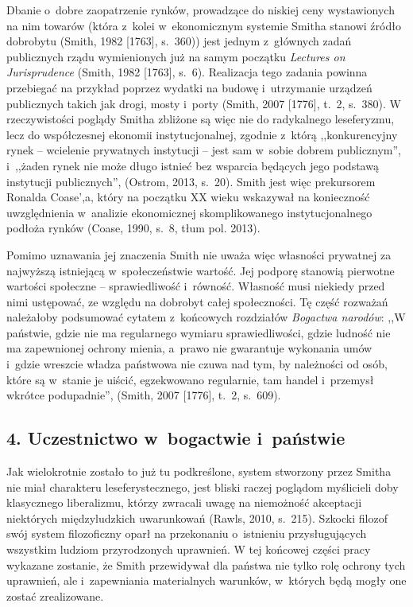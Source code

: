 Dbanie o~dobre zaopatrzenie rynków, prowadzące do niskiej ceny wystawionych na nim towarów (która z~kolei w~ekonomicznym systemie Smitha stanowi źródło dobrobytu \label{ref:RND3lhiPntOYy}(Smith, 1982 [1763], s.~360)) jest jednym z~głównych zadań publicznych rządu wymienionych już na samym początku \textit{Lectures on Jurisprudence} \label{ref:RNDcEz98pxQ1r}(Smith, 1982 [1763], s.~6). Realizacja tego zadania powinna przebiegać na przykład poprzez wydatki na budowę i~utrzymanie urządzeń publicznych takich jak drogi, mosty i~porty \label{ref:RNDun5237a8bv}(Smith, 2007 [1776], t.~2, s.~380). W rzeczywistości poglądy Smitha zbliżone są więc nie do radykalnego leseferyzmu, lecz do współczesnej ekonomii instytucjonalnej, zgodnie z~którą ,,konkurencyjny rynek -- wcielenie prywatnych instytucji -- jest sam w~sobie dobrem publicznym'', i~,,żaden rynek nie może długo istnieć bez wsparcia będących jego podstawą instytucji publicznych'', \label{ref:RNDjhM4fjDb9v}(Ostrom, 2013, s.~20). Smith jest więc prekursorem Ronalda Coase',a, który na początku XX wieku wskazywał na konieczność uwzględnienia w~analizie ekonomicznej skomplikowanego instytucjonalnego podłoża rynków \label{ref:RNDGvBhji2UBe}(Coase, 1990, s.~8, tłum pol. 2013).

Pomimo uznawania jej znaczenia Smith nie uważa więc własności prywatnej za najwyższą istniejącą w~społeczeństwie wartość. Jej podporę stanowią pierwotne wartości społeczne -- sprawiedliwość i~równość. Własność musi niekiedy przed nimi ustępować, ze względu na dobrobyt całej społeczności. Tę część rozważań należałoby podsumować cytatem z~końcowych rozdziałów \textit{Bogactwa narodów}: ,,W państwie, gdzie nie ma regularnego wymiaru sprawiedliwości, gdzie ludność nie ma zapewnionej ochrony mienia, a~prawo nie gwarantuje wykonania umów i~gdzie wreszcie władza państwowa nie czuwa nad tym, by należności od osób, które są w~stanie je uiścić, egzekwowano regularnie, tam handel i~przemysł wkrótce podupadnie'', \label{ref:RNDNF5lVCSa0q}(Smith, 2007 [1776], t.~2, s.~609).

\subsection[4. Uczestnictwo w~bogactwie i~państwie]{4. Uczestnictwo w~bogactwie i~państwie}

Jak wielokrotnie zostało to już tu podkreślone, system stworzony przez Smitha nie miał charakteru leseferystecznego, jest bliski raczej poglądom myślicieli doby klasycznego liberalizmu, którzy zwracali uwagę na niemożność akceptacji niektórych międzyludzkich uwarunkowań \label{ref:RNDu40KwlEMET}(Rawls, 2010, s.~215). Szkocki filozof swój system filozoficzny oparł na przekonaniu o~istnieniu przysługujących wszystkim ludziom przyrodzonych uprawnień. W tej końcowej części pracy wykazane zostanie, że Smith przewidywał dla państwa nie tylko rolę ochrony tych uprawnień, ale i~zapewniania materialnych warunków, w~których będą mogły one zostać zrealizowane.


